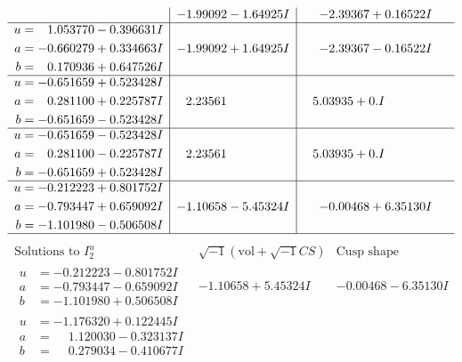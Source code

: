 \documentclass[1p]{elsarticle_modified}
\theoremstyle{definition}
\newcommand{\I}{\sqrt{-1}}
\begin{document}
$$\begin{array}{c|c|c}
 & -1.99092 - 1.64925 I & -2.39367 + 0.16522 I \\ \hline\begin{aligned}
u &= \phantom{-}1.053770 - 0.396631 I \\
a &= -0.660279 + 0.334663 I \\
b &= \phantom{-}0.170936 + 0.647526 I\end{aligned}
 & -1.99092 + 1.64925 I & -2.39367 - 0.16522 I \\ \hline\begin{aligned}
u &= -0.651659 + 0.523428 I \\
a &= \phantom{-}0.281100 + 0.225787 I \\
b &= -0.651659 - 0.523428 I\end{aligned}
 & \phantom{-}2.23561\phantom{ +0.000000I} & \phantom{-}5.03935 + 0. I\phantom{ +0.000000I} \\ \hline\begin{aligned}
u &= -0.651659 - 0.523428 I \\
a &= \phantom{-}0.281100 - 0.225787 I \\
b &= -0.651659 + 0.523428 I\end{aligned}
 & \phantom{-}2.23561\phantom{ +0.000000I} & \phantom{-}5.03935 + 0. I\phantom{ +0.000000I} \\ \hline\begin{aligned}
u &= -0.212223 + 0.801752 I \\
a &= -0.793447 + 0.659092 I \\
b &= -1.101980 - 0.506508 I\end{aligned}
 & -1.10658 - 5.45324 I & -0.00468 + 6.35130 I\\
 \hline 
 \end{array}$$\newpage$$\begin{array}{c|c|c}  
\text{Solutions to }I^u_{2}& \I (\text{vol} + \sqrt{-1}CS) & \text{Cusp shape}\\
 \hline 
\begin{aligned}
u &= -0.212223 - 0.801752 I \\
a &= -0.793447 - 0.659092 I \\
b &= -1.101980 + 0.506508 I\end{aligned}
 & -1.10658 + 5.45324 I & -0.00468 - 6.35130 I \\ \hline\begin{aligned}
u &= -1.176320 + 0.122445 I \\
a &= \phantom{-}1.120030 - 0.323137 I \\
b &= \phantom{-}0.279034 - 0.410677 I\end{aligned}

\end{array}$$
\end{document}

